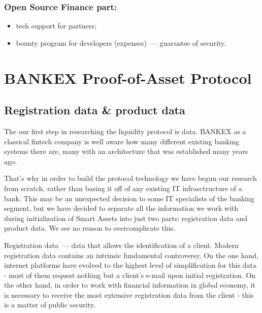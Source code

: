 \documentclass{article}
\begin{document}
\begin{multicols}{2}
\subsubsection*{Open Source Finance part:}

\begin{itemize}
\item tech support for partners;
\item bounty program for developers (expenses)~--- guarantee of security.
\end{itemize}

\section{BANKEX Proof-of-Asset Protocol}

\subsection{Registration data \& product data}

The our first step in researching the liquidity protocol is data. BANKEX as a classical fintech company is well aware how many different existing banking systems there are, many with an architecture that was established many years ago.

That’s why in order to build the protocol technology we have begun our research from scratch, rather than basing it off of any existing IT infrasctructure of a bank. This may be an unexpected decision to some IT specialists of the banking segment, but we have decided to separate all the information we work with during initialization of Smart Assets into just two parts: registration data and product data. We see no reason to overcomplicate this.

Registration data~--- data that allows the identification of a client. Modern registration data contains an intrinsic fundamental controversy. On the one hand, internet platforms have evolved to the highest level of simplification for this data - most of them request nothing but a client’s e-mail upon initial registration. On the other hand, in order to work with financial information in global economy, it is necessary to receive the most extensive registration data from the client - this is a matter of public security.


\end{multicols}
\end{document}

